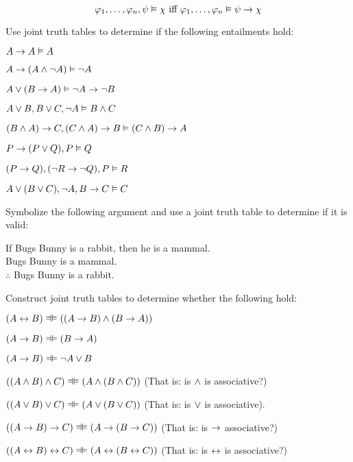 $$\mathcal{\varphi}_1, \ldots, \mathcal{\varphi}_n, \mathcal{\psi} \vDash \mathcal{\chi} \text{ iff } \mathcal{\varphi}_1, \ldots, \mathcal{\varphi}_n \vDash \mathcal{\psi} \rightarrow \mathcal{\chi}$$



\practiceproblems
\problempart
Use joint truth tables to determine if the following entailments hold:
\begin{earg}
\item $A\rightarrow A \vDash A$ %
\item $A\rightarrow(A\wedge\neg A) \vDash \neg A$ %
\item $A\vee(B\rightarrow A) \vDash \neg A \rightarrow \neg B$ %
\item $A\vee B, B\vee C, \neg A \vDash B \wedge C$ %
\item $(B\wedge A)\rightarrow C, (C\wedge A)\rightarrow B \vDash (C\wedge B)\rightarrow A$ %
\item $P \rightarrow (P \vee Q), P \vDash Q$
\item $(P \rightarrow Q), (\neg R \rightarrow \neg Q), P \vDash R$
\item $A\vee(B\vee C), \neg A, B\rightarrow C \vDash C$ \\
\end{earg}


\problempart
Symbolize the following argument  and use a joint truth table to determine if it is valid:
\begin{earg}
\item[] If Bugs Bunny is a rabbit, then he is a mammal.\\
Bugs Bunny is a mammal.\\
$\therefore$ Bugs Bunny is a rabbit.

\end{earg}



\problempart
Construct joint truth tables to determine whether the following hold:
\begin{earg}
	\item $(A \eiff B) \lequiv ((A \eif B) \eand (B \eif A))$
	\item $(A \eif B) \lequiv (B \eif A)$
	\item $(A \eif B) \lequiv \enot A \eor B$
	\item $((A \eand B) \eand C) \lequiv (A \eand (B \eand C))$ (That is: is $\wedge$ is associative?)
	\item $((A \eor B) \eor C) \lequiv (A \eor (B \eor C))$ (That is: is $\vee$ is associative).
	\item $((A \eif B) \eif C) \lequiv (A \eif (B \eif C))$ (That is: is $\rightarrow$ associative?)
	\item $((A \eiff B) \eiff C) \lequiv (A \eiff (B \eiff C))$ (That is: is $\leftrightarrow$ is associative?)
\end{earg}

